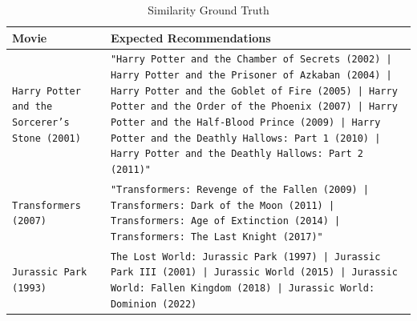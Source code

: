 \documentclass[journal]{IEEEtran}
\theoremstyle{mydefstyle}
\begin{document}
\begin{table}[ht]
\centering
\scriptsize
\caption{Similarity Ground Truth}
\label{tab:similarity_ground_truth}
\begin{tabular}{|>{\centering\arraybackslash}m{2cm}|>{\centering\arraybackslash}m{5cm}|}
\hline
\textbf{Movie} & \textbf{Expected Recommendations} \\
\hline
\texttt{Harry Potter and the Sorcerer's Stone (2001)} & \texttt{"Harry Potter and the Chamber of Secrets (2002) | Harry Potter and the Prisoner of Azkaban (2004) | Harry Potter and the Goblet of Fire (2005) | Harry Potter and the Order of the Phoenix (2007) | Harry Potter and the Half-Blood Prince (2009) | Harry Potter and the Deathly Hallows: Part 1 (2010) | Harry Potter and the Deathly Hallows: Part 2 (2011)"} \\
\hline
\texttt{Transformers (2007)} & \texttt{"Transformers: Revenge of the Fallen (2009) | Transformers: Dark of the Moon (2011) | Transformers: Age of Extinction (2014) | Transformers: The Last Knight (2017)"} \\
\hline
\texttt{Jurassic Park (1993)} & \texttt{The Lost World: Jurassic Park (1997) | Jurassic Park III (2001) | Jurassic World (2015) | Jurassic World: Fallen Kingdom (2018) | Jurassic World: Dominion (2022)} \\
\hline
\end{tabular}
\end{table}
\end{document}
